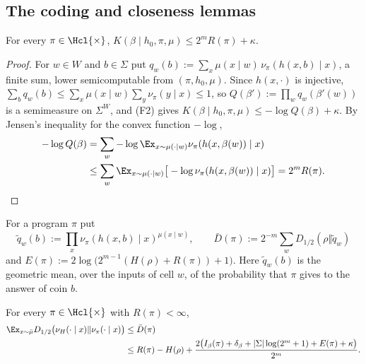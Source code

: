 \subsection{The coding and closeness lemmas}\label{app:imit:lemmas}

\begin{lemma}\label{lem:imit:coding}
For every $\pi\in\Hcl{\times}$, $K(\beta\mid h_0,\pi,\mu)\le2^mR(\pi)+\kappa$.
\end{lemma}

\begin{proof}
For $w\in W$ and $b\in\Sigma$ put $q_w(b):=\sum_x\mu(x\mid w)\,\nu_\pi(h(x,b)\mid x)$, a finite sum, lower semicomputable from $(\pi,h_0,\mu)$. Since $h(x,\cdot)$ is injective, $\sum_bq_w(b)\le\sum_x\mu(x\mid w)\sum_y\nu_\pi(y\mid x)\le1$, so $Q(\beta'):=\prod_wq_w(\beta'(w))$ is a semimeasure on $\Sigma^W$, and (F2) gives $K(\beta\mid h_0,\pi,\mu)\le-\log Q(\beta)+\kappa$. By Jensen's inequality for the convex function $-\log$,
\begin{align*}
-\log Q(\beta)&=\sum_w-\log\Ex_{x\sim\mu(\cdot\mid w)}\nu_\pi(h(x,\beta(w))\mid x)\\
&\le\sum_w\Ex_{x\sim\mu(\cdot\mid w)}\big[-\log\nu_\pi(h(x,\beta(w))\mid x)\big]=2^mR(\pi).\qedhere
\end{align*}
\end{proof}

For a program $\pi$ put
\[
\tilde q_w(b):=\prod_x\nu_\pi(h(x,b)\mid x)^{\mu(x\mid w)},\qquad\bar D(\pi):=2^{-m}\sum_wD_{1/2}(\rho\Vert\tilde q_w)
\]
and $E(\pi):=2\log\big(2^{m-1}(H(\rho)+R(\pi))+1\big)$. Here $\tilde q_w(b)$ is the geometric mean, over the inputs of cell $w$, of the probability that $\pi$ gives to the answer of coin $b$.

\begin{lemma}[Closeness]\label{lem:imit:closeness}
For every $\pi\in\Hcl{\times}$ with $R(\pi)<\infty$,
\begin{align*}
\Ex_{x\sim\bar\mu}D_{1/2}\big(\nu_H(\cdot\mid x)\Vert\nu_\pi(\cdot\mid x)\big)&\le\bar D(\pi)\\
&\le R(\pi)-H(\rho)+\frac{2\big(I_\beta(\pi)+\delta_\beta+|\Sigma|\log(2^m+1)+E(\pi)+\kappa\big)}{2^m}.
\end{align*}
\end{lemma}

